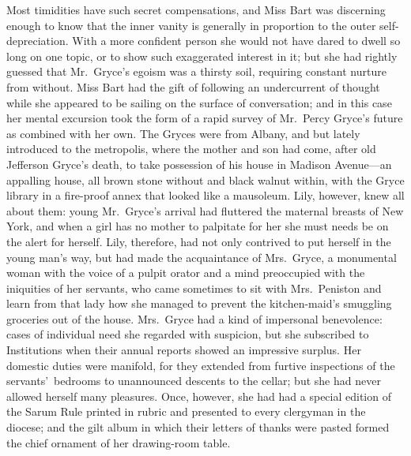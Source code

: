 \documentclass[12pt,a4paper]{book}
\begin{document}
Most timidities have such secret compensations, and Miss Bart was
discerning enough to know that the inner vanity is generally in
proportion to the outer self-depreciation. With a more confident
person she would not have dared to dwell so long on one topic, or
to show such exaggerated interest in it; but she had rightly
guessed that Mr.\ Gryce's egoism was a thirsty soil, requiring
constant nurture from without. Miss Bart had the gift of
following an undercurrent of thought while she appeared to be
sailing on the surface of conversation; and in this case her
mental excursion took the form of a rapid survey of Mr.\ Percy
Gryce's future as combined with her own. The Gryces were from
Albany, and but lately introduced to the metropolis, where the
mother and son had come, after old Jefferson Gryce's death, to
take possession of his house in Madison Avenue---an appalling
house, all brown stone without and black walnut within, with the
Gryce library in a fire-proof annex that looked like a mausoleum. 
Lily, however, knew all about them: young Mr.\ Gryce's arrival had
fluttered the maternal breasts of New York, and when a girl has
no mother to palpitate for her she must needs be on the alert for
herself. Lily, therefore, had not only contrived to put herself
in the young man's way, but had made the acquaintance of
Mrs.\ Gryce, a monumental woman with the voice of a pulpit orator
and a mind preoccupied with the iniquities of her servants, who
came sometimes to sit with Mrs.\ Peniston and learn from that lady
how she managed to prevent the kitchen-maid's smuggling groceries
out of the house. Mrs.\ Gryce had a kind of impersonal
benevolence: cases of individual need she regarded with
suspicion, but she subscribed to Institutions when their annual
reports showed an impressive surplus. Her domestic duties were
manifold, for they extended from furtive inspections of the
servants'\ bedrooms to unannounced descents to the cellar; but she
had never allowed herself many pleasures. Once, however, she had
had a special edition of the Sarum Rule printed in rubric and
presented to every clergyman in the diocese; and the gilt album
in which their letters of thanks were pasted formed the chief
ornament of her drawing-room table.
\end{document}
